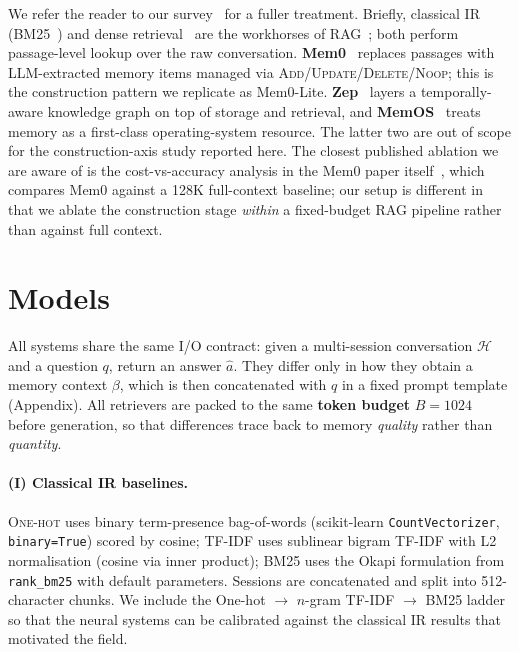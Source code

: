 \documentclass[11pt]{article}
\begin{document}
We refer the reader to our survey~\citep{yang2026survey} for a fuller
treatment. Briefly, classical IR
(BM25~\citep{robertson2009bm25}) and dense
retrieval~\citep{karpukhin2020dpr} are the workhorses of
RAG~\citep{lewis2020rag}; both perform passage-level lookup over the
raw conversation. \textbf{Mem0}~\citep{chhikara2025mem0} replaces
passages with LLM-extracted memory items managed via
\textsc{Add}/\textsc{Update}/\textsc{Delete}/\textsc{Noop}; this is
the construction pattern we replicate as Mem0-Lite.
\textbf{Zep}~\citep{rasmussen2025zep} layers a temporally-aware
knowledge graph on top of storage and retrieval, and
\textbf{MemOS}~\citep{li2025memos} treats memory as a first-class
operating-system resource. The latter two are out of scope for the
construction-axis study reported here. The closest published
ablation we are aware of is the cost-vs-accuracy analysis in the
Mem0 paper itself~\citep{chhikara2025mem0}, which compares Mem0
against a 128K full-context baseline; our setup is different in
that we ablate the construction stage \emph{within} a fixed-budget
RAG pipeline rather than against full context.

\section{Models}
\label{sec:methods}

All systems share the same I/O contract: given a multi-session
conversation $\mathcal{H}$ and a question $q$, return an answer
$\hat{a}$. They differ only in how they obtain a memory context
$\beta$, which is then concatenated with $q$ in a fixed prompt
template (Appendix). All retrievers are packed to the same
\textbf{token budget} $B{=}1024$ before generation, so that
differences trace back to memory \emph{quality} rather than
\emph{quantity}.

\paragraph{(I) Classical IR baselines.}
\textsc{One-hot} uses binary term-presence bag-of-words
(scikit-learn \texttt{CountVectorizer}, \texttt{binary=True}) scored
by cosine; \textsc{TF-IDF} uses sublinear bigram TF-IDF with L2
normalisation (cosine via inner product); \textsc{BM25} uses the
Okapi formulation from \texttt{rank\_bm25} with default parameters.
Sessions are concatenated and split into 512-character chunks. We
include the One-hot $\to$ $n$-gram TF-IDF $\to$ BM25 ladder so that
the neural systems can be calibrated against the classical IR
results that motivated the field.
\end{document}
